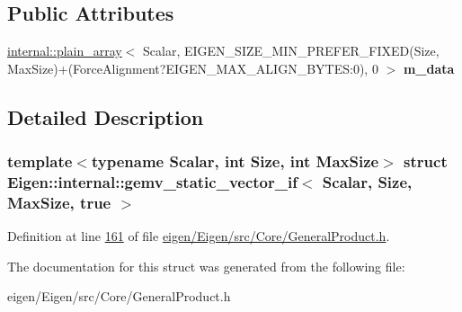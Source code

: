 \subsection*{Public Attributes}
\begin{DoxyCompactItemize}
\item 
\mbox{\label{struct_eigen_1_1internal_1_1gemv__static__vector__if_3_01_scalar_00_01_size_00_01_max_size_00_01true_01_4_aa76b564a05bfdf40d93c33eb713b5b33}} 
\hyperlink{struct_eigen_1_1internal_1_1plain__array}{internal\+::plain\+\_\+array}$<$ Scalar, E\+I\+G\+E\+N\+\_\+\+S\+I\+Z\+E\+\_\+\+M\+I\+N\+\_\+\+P\+R\+E\+F\+E\+R\+\_\+\+F\+I\+X\+ED(Size, Max\+Size)+(Force\+Alignment?E\+I\+G\+E\+N\+\_\+\+M\+A\+X\+\_\+\+A\+L\+I\+G\+N\+\_\+\+B\+Y\+T\+E\+S\+:0), 0 $>$ {\bfseries m\+\_\+data}
\end{DoxyCompactItemize}


\subsection{Detailed Description}
\subsubsection*{template$<$typename Scalar, int Size, int Max\+Size$>$\newline
struct Eigen\+::internal\+::gemv\+\_\+static\+\_\+vector\+\_\+if$<$ Scalar, Size, Max\+Size, true $>$}



Definition at line \hyperlink{eigen_2_eigen_2src_2_core_2_general_product_8h_source_l00161}{161} of file \hyperlink{eigen_2_eigen_2src_2_core_2_general_product_8h_source}{eigen/\+Eigen/src/\+Core/\+General\+Product.\+h}.



The documentation for this struct was generated from the following file\+:\begin{DoxyCompactItemize}
\item 
eigen/\+Eigen/src/\+Core/\+General\+Product.\+h\end{DoxyCompactItemize}

